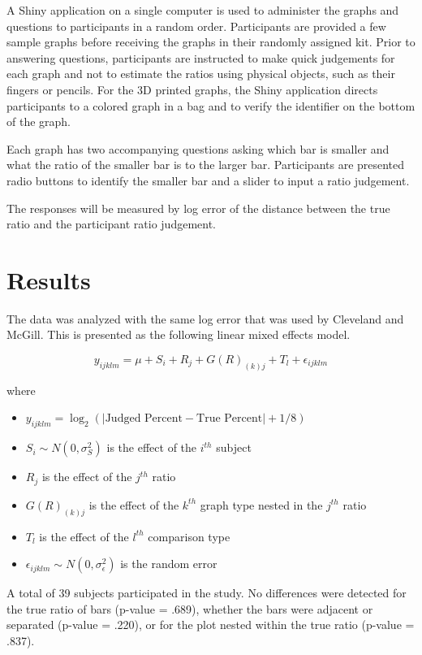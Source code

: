 \documentclass[letterpaper,inpress]{jdsart}
\begin{document}
A Shiny application on a single computer is used to administer the graphs and questions to participants in a random order.
Participants are provided a few sample graphs before receiving the graphs in their randomly assigned kit.
Prior to answering questions, participants are instructed to make quick judgements for each graph and not to estimate the ratios using physical objects, such as their fingers or pencils.
For the 3D printed graphs, the Shiny application directs participants to a colored graph in a bag and to verify the identifier on the bottom of the graph.

Each graph has two accompanying questions asking which bar is smaller and what the ratio of the smaller bar is to the larger bar.
Participants are presented radio buttons to identify the smaller bar and a slider to input a ratio judgement.

The responses will be measured by log error of the distance between the true ratio and the participant ratio judgement.

\hypertarget{results}{%
\section{Results}\label{results}}

The data was analyzed with the same log error that was used by Cleveland and McGill. This is presented as the following linear mixed effects model.

\[y_{ijklm}=\mu+S_i+R_j+G(R)_{(k)j}+T_l+\epsilon_{ijklm}\]

\noindent where

\begin{itemize}
\item
  \(y_{ijklm}=\log_2(|\text{Judged Percent} - \text{True Percent}|+1/8)\)
\item
  \(S_i\sim N(0,\sigma^2_S)\) is the effect of the \(i^{th}\) subject
\item
  \(R_j\) is the effect of the \(j^{th}\) ratio
\item
  \(G(R)_{(k)j}\) is the effect of the \(k^{th}\) graph type nested in the \(j^{th}\) ratio
\item
  \(T_l\) is the effect of the \(l^{th}\) comparison type
\item
  \(\epsilon_{ijklm}\sim N(0,\sigma^2_\epsilon)\) is the random error
\end{itemize}

A total of 39 subjects participated in the study. No differences were detected for the true ratio of bars (p-value = .689), whether the bars were adjacent or separated (p-value = .220), or for the plot nested within the true ratio (p-value = .837).
\end{document}

